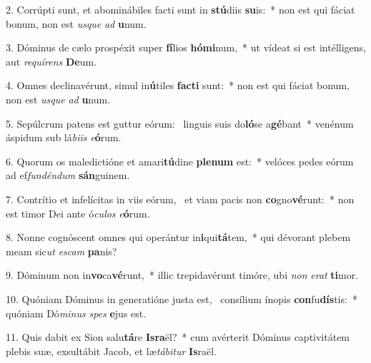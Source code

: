 2. Corrúpti sunt, et abominábiles facti sunt in \textbf{stú}diis \textbf{su}is:~*  non est qui fáciat bonum, non est \textit{us}\textit{que} \textit{ad} \textbf{u}num.\

3. Dóminus de cælo prospéxit super \textbf{fí}lios \textbf{hó}\textbf{mi}num,~*  ut vídeat si est intélligens, aut \textit{re}\textit{quí}\textit{rens} \textbf{De}um.\

4. Omnes declinavérunt, simul in\textbf{ú}tiles \textbf{fac}\textbf{ti} sunt:~*  non est qui fáciat bonum, non est \textit{us}\textit{que} \textit{ad} \textbf{u}num.\

5. Sepúlcrum patens est guttur eórum: \dag\  linguis suis do\textbf{ló}se a\textbf{gé}bant~*  venénum áspidum sub lá\textit{bi}\textit{is} \textit{e}\textbf{ó}rum.\

6. Quorum os maledictióne et amari\textbf{tú}dine \textbf{ple}\textbf{num} est:~*  velóces pedes eórum ad ef\textit{fun}\textit{dén}\textit{dum} \textbf{sán}guinem.\

7. Contrítio et infelícitas in viis eórum, \dag\  et viam pacis non \textbf{co}gno\textbf{vé}runt:~*  non est timor Dei ante ó\textit{cu}\textit{los} \textit{e}\textbf{ó}rum.\

8. Nonne cognóscent omnes qui operántur in\textbf{i}qui\textbf{tá}tem,~*  qui dévorant plebem meam sic\textit{ut} \textit{es}\textit{cam} \textbf{pa}nis?\

9. Dóminum non in\textbf{vo}ca\textbf{vé}runt,~*  illic trepidavérunt timóre, ubi \textit{non} \textit{e}\textit{rat} \textbf{ti}mor.\

10. Quóniam Dóminus in generatióne justa est, \dag\  consílium ínopis \textbf{con}fu\textbf{dís}tis:~*  quóniam Dó\textit{mi}\textit{nus} \textit{spes} \textbf{e}jus est.\

11. Quis dabit ex Sion salu\textbf{tá}re \textbf{Is}\textbf{ra}ël?~*  cum avérterit Dóminus captivitátem plebis suæ, exsultábit Jacob, et læ\textit{tá}\textit{bi}\textit{tur} \textbf{Is}raël.\

